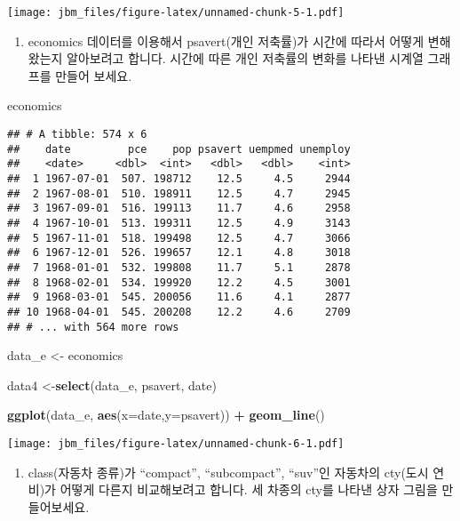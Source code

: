 \documentclass[]{article}
\newenvironment{Shaded}{\begin{snugshade}}{\end{snugshade}}
\newcommand{\DataTypeTok}[1]{\textcolor[rgb]{0.13,0.29,0.53}{#1}}
\newcommand{\KeywordTok}[1]{\textcolor[rgb]{0.13,0.29,0.53}{\textbf{#1}}}
\newcommand{\NormalTok}[1]{#1}
\newcommand{\OperatorTok}[1]{\textcolor[rgb]{0.81,0.36,0.00}{\textbf{#1}}}
\newcommand{\StringTok}[1]{\textcolor[rgb]{0.31,0.60,0.02}{#1}}
\providecommand{\tightlist}{%
  \setlength{\itemsep}{0pt}\setlength{\parskip}{0pt}}
\begin{document}
\texttt{[image: jbm\_files/figure-latex/unnamed-chunk-5-1.pdf]}

\begin{enumerate}
\def\labelenumi{\arabic{enumi}.}
\setcounter{enumi}{4}
\tightlist
\item
  economics 데이터를 이용해서 psavert(개인 저축률)가 시간에 따라서
  어떻게 변해왔는지 알아보려고 합니다. 시간에 따른 개인 저축률의 변화를
  나타낸 시계열 그래프를 만들어 보세요.
\end{enumerate}

\begin{Shaded}
\begin{Highlighting}[]
\NormalTok{economics}
\end{Highlighting}
\end{Shaded}

\begin{verbatim}
## # A tibble: 574 x 6
##    date         pce    pop psavert uempmed unemploy
##    <date>     <dbl>  <int>   <dbl>   <dbl>    <int>
##  1 1967-07-01  507. 198712    12.5     4.5     2944
##  2 1967-08-01  510. 198911    12.5     4.7     2945
##  3 1967-09-01  516. 199113    11.7     4.6     2958
##  4 1967-10-01  513. 199311    12.5     4.9     3143
##  5 1967-11-01  518. 199498    12.5     4.7     3066
##  6 1967-12-01  526. 199657    12.1     4.8     3018
##  7 1968-01-01  532. 199808    11.7     5.1     2878
##  8 1968-02-01  534. 199920    12.2     4.5     3001
##  9 1968-03-01  545. 200056    11.6     4.1     2877
## 10 1968-04-01  545. 200208    12.2     4.6     2709
## # ... with 564 more rows
\end{verbatim}

\begin{Shaded}
\begin{Highlighting}[]
\NormalTok{data_e <-}\StringTok{ }\NormalTok{economics}

\NormalTok{data4 <-}\KeywordTok{select}\NormalTok{(data_e, psavert, date)}

\KeywordTok{ggplot}\NormalTok{(data_e, }\KeywordTok{aes}\NormalTok{(}\DataTypeTok{x=}\NormalTok{date,}\DataTypeTok{y=}\NormalTok{psavert)) }\OperatorTok{+}
\StringTok{  }\KeywordTok{geom_line}\NormalTok{()}
\end{Highlighting}
\end{Shaded}

\texttt{[image: jbm\_files/figure-latex/unnamed-chunk-6-1.pdf]}

\begin{enumerate}
\def\labelenumi{\arabic{enumi}.}
\setcounter{enumi}{5}
\tightlist
\item
  class(자동차 종류)가 ``compact'', ``subcompact'', ``suv''인 자동차의
  cty(도시 연비)가 어떻게 다른지 비교해보려고 합니다. 세 차종의 cty를
  나타낸 상자 그림을 만들어보세요.
\end{enumerate}
\end{document}
